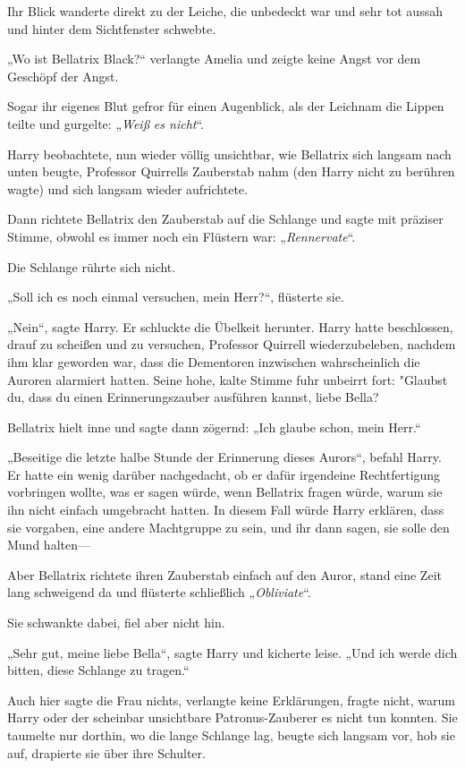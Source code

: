 {Ihr Blick wanderte direkt zu der Leiche, die unbedeckt war und sehr tot aussah und hinter dem Sichtfenster schwebte.

„Wo ist Bellatrix Black?“ verlangte Amelia und zeigte keine Angst vor dem Geschöpf der Angst.

Sogar ihr eigenes Blut gefror für einen Augenblick, als der Leichnam die Lippen teilte und gurgelte: „\emph{Weiß} \emph{es nicht}“.

Harry beobachtete, nun wieder völlig unsichtbar, wie Bellatrix sich langsam nach unten beugte, Professor Quirrells Zauberstab nahm (den Harry nicht zu berühren wagte) und sich langsam wieder aufrichtete.

Dann richtete Bellatrix den Zauberstab auf die Schlange und sagte mit präziser Stimme, obwohl es immer noch ein Flüstern war: „\emph{Rennervate}“.

Die Schlange rührte sich nicht.

„Soll ich es noch einmal versuchen, mein Herr?“, flüsterte sie.

„Nein“, sagte Harry. Er schluckte die Übelkeit herunter. Harry hatte beschlossen, drauf zu scheißen und zu versuchen, Professor Quirrell wiederzubeleben, nachdem ihm klar geworden war, dass die Dementoren inzwischen wahrscheinlich die Auroren alarmiert hatten. Seine hohe, kalte Stimme fuhr unbeirrt fort: "Glaubst du, dass du einen Erinnerungszauber ausführen kannst, liebe Bella?

Bellatrix hielt inne und sagte dann zögernd: „Ich glaube schon, mein Herr.“

„Beseitige die letzte halbe Stunde der Erinnerung dieses Aurors“, befahl Harry. Er hatte ein wenig darüber nachgedacht, ob er dafür irgendeine Rechtfertigung vorbringen wollte, was er sagen würde, wenn Bellatrix fragen würde, warum sie ihn nicht einfach umgebracht hatten. In diesem Fall würde Harry erklären, dass sie vorgaben, eine andere Machtgruppe zu sein, und ihr dann sagen, sie solle den Mund halten—

Aber Bellatrix richtete ihren Zauberstab einfach auf den Auror, stand eine Zeit lang schweigend da und flüsterte schließlich „\emph{Obliviate}“.

Sie schwankte dabei, fiel aber nicht hin.

„Sehr gut, meine liebe Bella“, sagte Harry und kicherte leise. „Und ich werde dich bitten, diese Schlange zu tragen.“

Auch hier sagte die Frau nichts, verlangte keine Erklärungen, fragte nicht, warum Harry oder der scheinbar unsichtbare Patronus-Zauberer es nicht tun konnten. Sie taumelte nur dorthin, wo die lange Schlange lag, beugte sich langsam vor, hob sie auf, drapierte sie über ihre Schulter.

}
